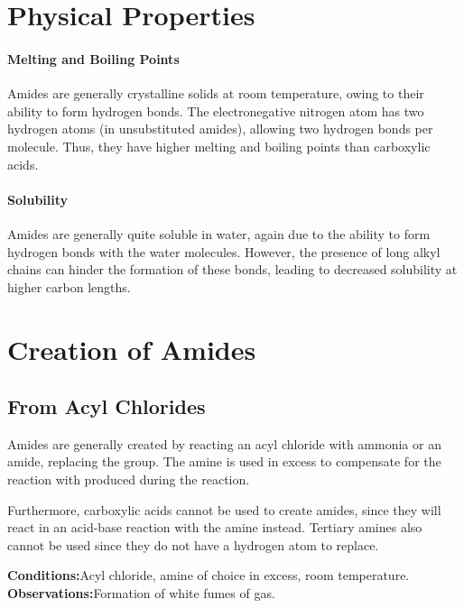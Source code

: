 


	\section{Physical Properties}

		\paragraph{Melting and Boiling Points}

		Amides are generally crystalline solids at room temperature, owing to their ability to form hydrogen bonds. The electronegative
		nitrogen atom has two hydrogen atoms (in unsubstituted amides), allowing two hydrogen bonds per molecule. Thus, they have
		higher melting and boiling points than carboxylic acids.


		\paragraph{Solubility}

		Amides are generally quite soluble in water, again due to the ability to form hydrogen bonds with the water molecules. However,
		the presence of long alkyl chains can hinder the formation of these bonds, leading to decreased solubility at higher carbon lengths.




	\pagebreak
	\section{Creation of Amides}

		\subsection{From Acyl Chlorides}

			Amides are generally created by reacting an acyl chloride with ammonia or an amide, replacing the \ch{\Cl} group. The amine is
			used in excess to compensate for the reaction with  produced during the reaction.

			Furthermore, carboxylic acids cannot be used to create amides, since they will react in an acid-base reaction with the amine instead.
			Tertiary amines also cannot be used since they do not have a hydrogen atom to replace.

			\vspace{1.5em}
			\vbox{\textbf{Conditions:}\tabto{35mm}Acyl chloride, amine of choice in excess, room temperature.}
			\vbox{\textbf{Observations:}\tabto{35mm}Formation of white fumes of  gas.}

